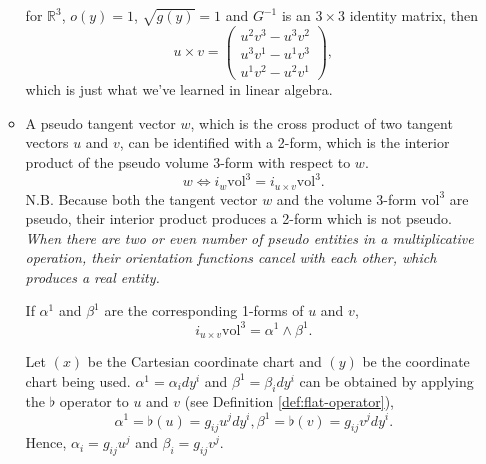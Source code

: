 \documentclass[11pt, a4paper]{book}
\begin{document}
\begin{enumerate}
\begin{itemize}
    for $\mathbb{R}^3$, $o(y)=1$, $\sqrt{g(y)}=1$ and $G^{-1}$ is an $3\times 3$ identity
    matrix, then
    \begin{equation}
      \label{eq:cross-product-cartesian-expr}
      u\times v = \begin{pmatrix}
        u^2v^3-u^3v^2 \\
        u^3v^1-u^1v^3 \\
        u^1v^2-u^2v^1
      \end{pmatrix},
    \end{equation}
    which is just what we've learned in linear algebra.
  \item A pseudo tangent vector $w$, which is the cross product of two tangent vectors $u$
    and $v$, can be identified with a 2-form, which is the interior product of the pseudo
    volume 3-form with respect to $w$.
    \begin{equation}
      w \Longleftrightarrow i_w \mathrm{vol}^3 = i_{u\times v} \mathrm{vol}^3.
    \end{equation}
    N.B. Because both the tangent vector $w$ and the volume 3-form $\mathrm{vol}^3$ are
    pseudo, their interior product produces a 2-form which is not pseudo. \emph{When there
      are two or even number of pseudo entities in a multiplicative operation, their
      orientation functions cancel with each other, which produces a real entity.}

    If $\alpha^1$ and $\beta^1$ are the corresponding 1-forms of $u$ and $v$,
    \begin{equation}
      i_{u\times v} \mathrm{vol}^3 = \alpha^1 \wedge \beta^1.
    \end{equation}
    
    \begin{Proof}
      Let $(x)$ be the Cartesian coordinate chart and $(y)$ be the coordinate chart being
      used. $\alpha^1 = \alpha_i dy^i$ and $\beta^1 = \beta_i dy^i$ can be obtained by
      applying the $\flat$ operator to $u$ and $v$ (see Definition
      \ref{def:flat-operator}),
      \begin{equation*}
        \alpha^1 = \flat(u) = g_{ij}u^j dy^i, \beta^1 = \flat(v) = g_{ij} v^j dy^i.
      \end{equation*}
      Hence, $\alpha_i = g_{ij}u^j$ and $\beta_i = g_{ij}v^j$.


\end{Proof}
\end{itemize}
\end{enumerate}
\end{document}
